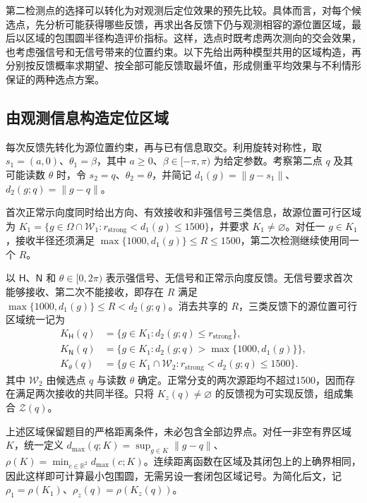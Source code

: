 \documentclass[UTF8,a4paper,zihao=-4,fontset=none]{ctexart}
\begin{document}
第二检测点的选择可以转化为对观测后定位效果的预先比较。具体而言，对每个候选点，先分析可能获得哪些反馈，再求出各反馈下仍与观测相容的源位置区域，最后以区域的包围圆半径构造评价指标。这样，选点时既考虑两次测向的交会效果，也考虑强信号和无信号带来的位置约束。以下先给出两种模型共用的区域构造，再分别按反馈概率求期望、按全部可能反馈取最坏值，形成侧重平均效果与不利情形保证的两种选点方案。

\subsection{由观测信息构造定位区域}

每次反馈先转化为源位置约束，再与已有信息取交。利用旋转对称性，取 \(s_1=(a,0)\)、\(\theta_1=\beta\)，其中 \(a\ge0\)、\(\beta\in[-\pi,\pi)\) 为给定参数。考察第二点 \(q\) 及其可能读数 \(\theta\) 时，令 \(s_2=q\)、\(\theta_2=\theta\)，并简记 \(d_1(g)=\|g-s_1\|\)、\(d_2(g;q)=\|g-q\|\)。

首次正常示向度同时给出方向、有效接收和非强信号三类信息，故源位置可行区域为 \(K_1=\{g\in\Omega\cap\mathcal W_1:r_{\mathrm{strong}}<d_1(g)\le1500\}\)，并要求 \(K_1\ne\varnothing\)。对任一 \(g\in K_1\)，接收半径还须满足 \(\max\{1000,d_1(g)\}\le R\le1500\)，第二次检测继续使用同一个 \(R\)。

以 \(\mathsf H\)、\(\mathsf N\) 和 \(\theta\in[0,2\pi)\) 表示强信号、无信号和正常示向度反馈。无信号要求首次能够接收、第二次不能接收，即存在 \(R\) 满足 \(\max\{1000,d_1(g)\}\le R<d_2(g;q)\)。消去共享的 \(R\)，三类反馈下的源位置可行区域统一记为
\begin{equation}
\begin{aligned}
K_{\mathsf H}(q)&=\{g\in K_1:d_2(g;q)\le r_{\mathrm{strong}}\},\\
K_{\mathsf N}(q)&=\{g\in K_1:d_2(g;q)>\max\{1000,d_1(g)\}\},\\
K_\theta(q)&=\{g\in K_1\cap\mathcal W_2:r_{\mathrm{strong}}<d_2(g;q)\le1500\}.
\end{aligned}
\label{eq:q2-pair-regions}
\end{equation}
其中 \(\mathcal W_2\) 由候选点 \(q\) 与读数 \(\theta\) 确定。正常分支的两次源距均不超过1500，因而存在满足两次接收的共同半径。只将 \(K_z(q)\ne\varnothing\) 的反馈视为可实现反馈，组成集合 \(\mathcal Z(q)\)。

上述区域保留题目的严格距离条件，未必包含全部边界点。对任一非空有界区域 \(K\)，统一定义 \(d_{\max}(q;K)=\sup_{g\in K}\|g-q\|\)、\(\rho(K)=\min_{c\in\mathbb R^2}d_{\max}(c;K)\)。连续距离函数在区域及其闭包上的上确界相同，因此这样即可计算最小包围圆，无需另设一套闭包区域记号。为简化后文，记 \(\rho_1=\rho(K_1)\)、\(\rho_z(q)=\rho(K_z(q))\)。
\end{document}
